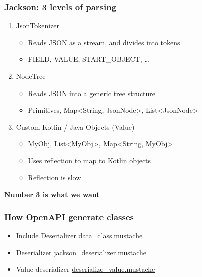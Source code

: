 \documentclass{beamer}
\begin{document}
    \begin{frame}
        \frametitle{Jackson: 3 levels of parsing}
        \begin{enumerate}
            \item JsonTokenizer
            \begin{itemize}
                \item Reads JSON as a stream, and divides into tokens
                \item FIELD, VALUE, START\_OBJECT, \ldots
            \end{itemize}
            \item NodeTree
            \begin{itemize}
                \item Reads JSON into a generic tree structure
                \item Primitives, Map<String, JsonNode>, List<JsonNode>
            \end{itemize}
            \item Custom Kotlin / Java Objects (Value)
            \begin{itemize}
                \item MyObj, List<MyObj>, Map<String, MyObj>
                \item Uses reflection to map to Kotlin objects
                \item Reflection is slow
            \end{itemize}
        \end{enumerate}

        \textbf{Number 3 is what we want}
    \end{frame}




    \begin{frame}
        \frametitle{How OpenAPI generate classes}
        \begin{itemize}

            \item Include Deserializer
            \href{file:///home/kny/src/personal/jackson-speedup/openapi-templates/data_class.mustache}{data\_class.mustache}

            \item Deserializer
            \href{file:/home/kny/src/personal/jackson-speedup/openapi-templates/jackson_deserializer.mustache}{jackson\_deserializer.mustache}

            \item Value deserializer
            \href{file:///home/kny/src/personal/jackson-speedup/openapi-templates/jackson_deserializer.mustache}{deserialize\_value.mustache}
        \end{itemize}

    \end{frame}
\end{document}
